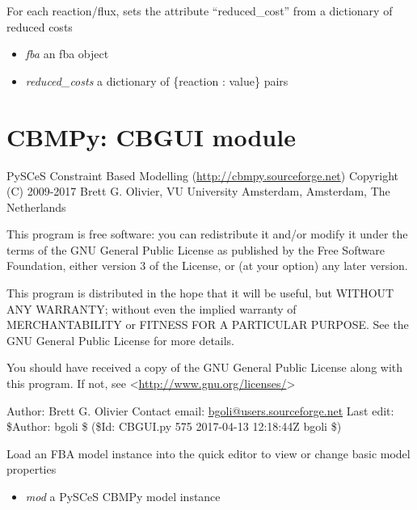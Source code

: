 \documentclass[a4paper,11pt,english]{sphinxmanual}
\begin{document}
\begin{fulllineitems}
\label{modules_doc:cbmpy.CBGLPK.setReducedCosts}
For each reaction/flux, sets the attribute ``reduced\_cost'' from a dictionary of
reduced costs
\begin{itemize}
\item {} 
\emph{fba} an fba object

\item {} 
\emph{reduced\_costs} a dictionary of \{reaction : value\} pairs

\end{itemize}

\end{fulllineitems}

\label{modules_doc:module-cbmpy.CBGUI}

\section{CBMPy: CBGUI module}
\label{modules_doc:cbmpy-cbgui-module}
PySCeS Constraint Based Modelling (\url{http://cbmpy.sourceforge.net})
Copyright (C) 2009-2017 Brett G. Olivier, VU University Amsterdam, Amsterdam, The Netherlands

This program is free software: you can redistribute it and/or modify
it under the terms of the GNU General Public License as published by
the Free Software Foundation, either version 3 of the License, or
(at your option) any later version.

This program is distributed in the hope that it will be useful,
but WITHOUT ANY WARRANTY; without even the implied warranty of
MERCHANTABILITY or FITNESS FOR A PARTICULAR PURPOSE.  See the
GNU General Public License for more details.

You should have received a copy of the GNU General Public License
along with this program.  If not, see \textless{}\url{http://www.gnu.org/licenses/}\textgreater{}

Author: Brett G. Olivier
Contact email: \href{mailto:bgoli@users.sourceforge.net}{bgoli@users.sourceforge.net}
Last edit: \$Author: bgoli \$ (\$Id: CBGUI.py 575 2017-04-13 12:18:44Z bgoli \$)

\begin{fulllineitems}
\label{modules_doc:cbmpy.CBGUI.loadCBGUI}
Load an FBA model instance into the quick editor to view or change basic model properties
\begin{itemize}
\item {} 
\emph{mod} a PySCeS CBMPy model instance

\end{itemize}

\end{fulllineitems}
\end{document}
